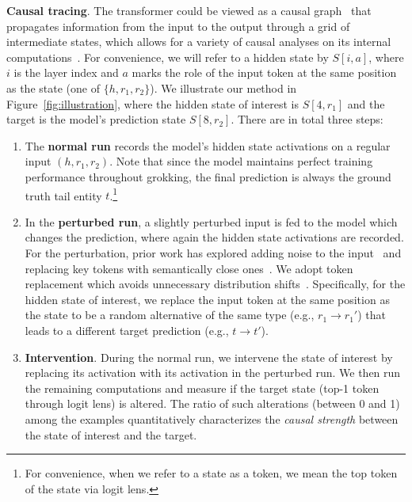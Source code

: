 \noindent\textbf{Causal tracing}. The transformer could be viewed as a causal graph~\citep{pearl2009causality} that propagates information from the input to the output through a grid of intermediate states, which allows for a variety of causal analyses on its internal computations~\citep{vig2020investigating, meng2022locating, hanna2023how, wang2023interpretability, feng2024how}. For convenience, we will refer to a hidden state by $S[i,a]$, where $i$ is the layer index and $a$ marks the role of the input token at the same position as the state (one of $\{h, r_1, r_2\}$). We illustrate our method in Figure~\ref{fig:illustration}, where the hidden state of interest is $S[4,r_1]$ and the target is the model's prediction state $S[8,r_2]$. There are in total three steps:
\begin{enumerate}[noitemsep,nolistsep,leftmargin=*]
    \item The \textbf{normal run} records the model's hidden state activations on a regular input $(h,r_1,r_2)$. Note that since the model maintains perfect training performance throughout grokking, the final prediction is always the ground truth tail entity $t$.\footnote{For convenience, when we refer to a state as a token, we mean the top token of the state via logit lens.}
    \item In the \textbf{perturbed run}, a slightly perturbed input is fed to the model which changes the prediction, where again the hidden state activations are recorded. For the perturbation, prior work has explored adding noise to the input~\citep{meng2022locating} and replacing key tokens with semantically close ones~\citep{vig2020investigating, feng2024how}. We adopt token replacement which avoids unnecessary distribution shifts~\citep{zhang2024best}. Specifically, for the hidden state of interest, we replace the input token at the same position as the state to be a random alternative of the same type (e.g., $r_1\rightarrow r_1'$) that leads to a different target prediction (e.g., $t\rightarrow t'$).
    \item \textbf{Intervention}. During the normal run, we intervene the state of interest by replacing its activation with its activation in the perturbed run. We then run the remaining computations and measure if the target state (top-\num{1} token through logit lens) is altered. The ratio of such alterations (between \num{0} and \num{1}) among the examples quantitatively characterizes the \textit{causal strength} between the state of interest and the target.
\end{enumerate}

